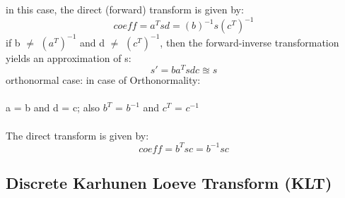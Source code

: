 \documentclass{article}
\begin{document}
in this case, the direct (forward) transform is given by:
\begin{equation}
    coeff = a^T s d = (b)^{-1} s (c^T)^{-1}
\end{equation}
if b $\neq$ $(a^T)^{-1}$ and d $\neq$ $(c^T)^{-1}$, then the forward-inverse transformation yields an approximation of s:
\begin{equation}
    s' = b a^T s d c \approxeq s
\end{equation}
orthonormal case:
in case of Orthonormality:\\
\\
a = b and d = c; also $b^T$ = $b^{-1}$ and $c^T$ = $c^{-1}$ \\
\\
The direct transform is given by:
\begin{equation}
    coeff = b^T s c = b^{-1} s c
\end{equation}
\subsection{Discrete Karhunen Loeve Transform (KLT)}
\end{document}
